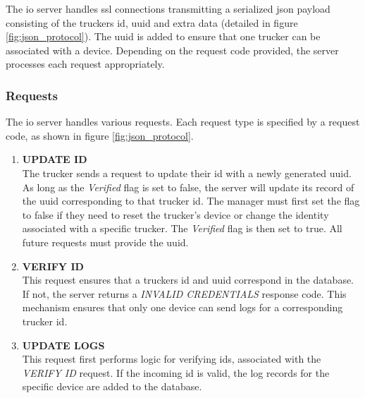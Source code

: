 The \Ac{io} server handles \ac{ssl} connections transmitting a serialized \ac{json} payload consisting of the truckers \ac{id}, \ac{uuid} and extra data (detailed in figure \ref{fig:json_protocol}).
The \ac{uuid} is added to ensure that one trucker can be associated with a device.
Depending on the request code provided, the server processes each request appropriately.

\subsubsection{Requests}
The \ac{io} server handles various requests.
Each request type is specified by a request code, as shown in figure \ref{fig:json_protocol}.
\begin{enumerate}
\item \textbf{UPDATE ID}\\
The trucker sends a request to update their \ac{id} with a newly generated \ac{uuid}.
As long as the \textit{Verified} flag is set to false, the server will update its record of the \ac{uuid} corresponding to that trucker \ac{id}.
The manager must first set the flag to false if they need to reset the trucker's device or change the identity associated with a specific trucker.
The \textit{Verified} flag is then set to true.
All future requests must provide the \ac{uuid}.

\item \textbf{VERIFY ID}\\
This request ensures that a truckers \ac{id} and \ac{uuid} correspond in the database.
If not, the server returns a \textit{INVALID CREDENTIALS} response code.
This mechanism ensures that only one device can send logs for a corresponding trucker \ac{id}.

\item \textbf{UPDATE LOGS}\\
This request first performs logic for verifying \ac{id}s, associated with the \textit{VERIFY ID} request.
If the incoming \ac{id} is valid, the log records for the specific device are added to the database.
\end{enumerate}


